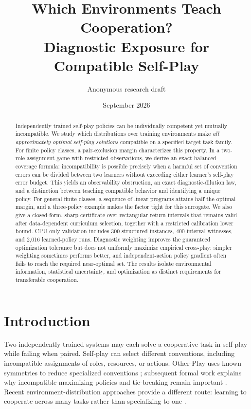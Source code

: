\documentclass[11pt]{article}
\title{Which Environments Teach Cooperation?\\Diagnostic Exposure for Compatible Self-Play}
\author{Anonymous research draft}
\date{September 2026}
\theoremstyle{definition}\newtheorem{definition}[theorem]{Definition}
\newcommand{\1}{\mathbf{1}}
\begin{document}
\maketitle
\begin{abstract}
Independently trained self-play policies can be individually competent yet mutually incompatible. We study which distributions over training environments make \emph{all approximately optimal self-play solutions} compatible on a specified target task family. For finite policy classes, a pair-exclusion margin characterizes this property. In a two-role assignment game with restricted observations, we derive an exact balanced-coverage formula: incompatibility is possible precisely when a harmful set of convention errors can be divided between two learners without exceeding either learner's self-play error budget. This yields an observability obstruction, an exact diagnostic-dilution law, and a distinction between teaching compatible behavior and identifying a unique policy. For general finite classes, a sequence of linear programs attains half the optimal margin, and a three-policy example makes the factor tight for this surrogate. We also give a closed-form, sharp certificate over rectangular return intervals that remains valid after data-dependent curriculum selection, together with a restricted calibration lower bound. CPU-only validation includes 300 structured instances, 400 interval witnesses, and 2,016 learned-policy runs. Diagnostic weighting improves the guaranteed optimization tolerance but does not uniformly maximize empirical cross-play: simpler weighting sometimes performs better, and independent-action policy gradient often fails to reach the required near-optimal set. The results isolate environmental information, statistical uncertainty, and optimization as distinct requirements for transferable cooperation.
\end{abstract}

\section{Introduction}
Two independently trained systems may each solve a cooperative task in self-play while failing when paired. Self-play can select different conventions, including incompatible assignments of roles, resources, or actions. Other-Play uses known symmetries to reduce specialized conventions \citep{hu2020}; subsequent formal work explains why incompatible maximizing policies and tie-breaking remain important \citep{treutlein2021}. Recent environment-distribution approaches provide a different route: learning to cooperate across many tasks rather than specializing to one \citep{jha2025,you2025}.
\end{document}
